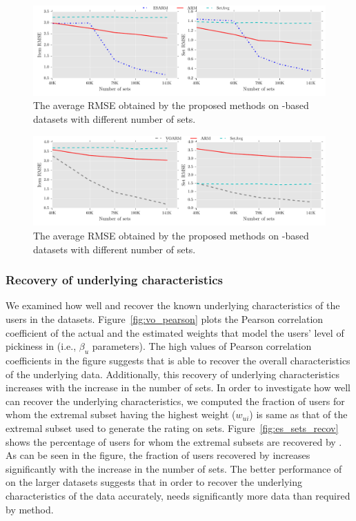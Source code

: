 \begin{figure}[t]
  \centerline{\includegraphics[scale=0.57]{figures/es_sets_sz.pdf}}
  \caption{The average RMSE obtained by the proposed methods on \ES-based datasets with different number of sets.}
  \label{fig:es_sets_sz}
\end{figure}

\begin{figure}[t]
  \centerline{\includegraphics[scale=0.57]{figures/vo_sets_sz.pdf}}
  \caption{The average RMSE obtained by the proposed methods on \VO-based datasets with different number of sets.}
  \label{fig:vo_sets_sz}
\end{figure}




\subsubsection{Recovery of underlying characteristics}\label{syn_recov}
We examined how well \ES and \VO recover the known underlying characteristics
of the users in the datasets. Figure~\ref{fig:vo_pearson} plots the Pearson correlation coefficient of
the actual and the estimated weights that model the users' level of pickiness in
\VO (i.e., $\beta_u$ parameters). The high values of Pearson correlation
coefficients in the figure
suggests that \VO is able to recover the overall characteristics of the
underlying data. Additionally, this recovery of underlying characteristics
increases with the increase in the number of sets. In order to investigate how well \ES can recover the underlying characteristics,
we computed the fraction of users for whom the extremal subset having the
highest weight ($w_{ui}$) is same as that of the extremal subset used to generate
the rating on sets.   
Figure~\ref{fig:es_sets_recov} shows the percentage of users for whom the extremal subsets are
recovered by \ES. 
As can be seen in the figure, the fraction of users recovered
by \ES increases significantly with the increase in the number of
sets.
The better performance of \ES on the larger
datasets suggests that in order to recover the underlying characteristics of the
data accurately, \ES needs significantly more data than required by
\VO method.

